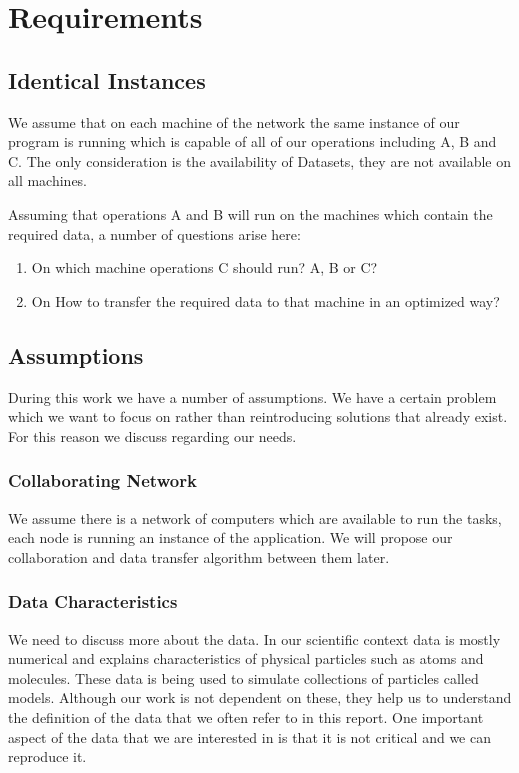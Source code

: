 \chapter{Requirements}
\label{cha:requirements}

\section{Identical Instances}
We assume that on each machine of the network the same instance of our program is running which 
is capable of all of our operations
including A, B and C. The only consideration is the availability of 
Datasets, they are not available on all machines.

Assuming that operations A and B will run on the machines which
contain the required data, a number of questions arise here:
\begin{enumerate}
\item On which machine operations C should run? A, B or C?
\item On How to transfer the required data to that machine in an 
optimized way?
\end{enumerate}

\section{Assumptions}
During this work we have a number of assumptions. We have a certain problem which we want to focus
on rather than reintroducing solutions that already exist. For this reason we discuss regarding our 
needs.

\subsection{Collaborating Network}
We assume there is a network of computers which are available to run the tasks, each node is running an instance
of the application. We will propose our collaboration and data transfer algorithm between them later.

\subsection{Data Characteristics}
We need to discuss more about the data. In our scientific context data is mostly numerical and explains characteristics
of physical particles such as atoms and molecules. These data is being used to simulate collections of particles called
models. Although our work is not dependent on these, they help us to understand the definition of the data that
we often refer to in this report. One important aspect of the data that we are interested in is that it is not critical 
and we can reproduce it. 

